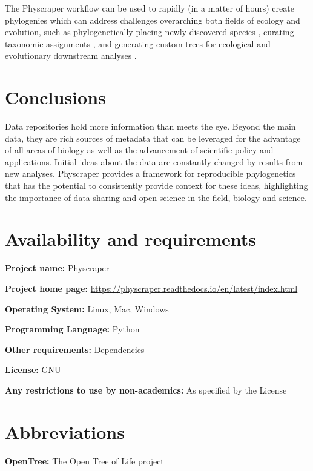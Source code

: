 \documentclass{bmcart}
\begin{document}
The Physcraper workflow can be used to rapidly (in a matter of hours) create
phylogenies which can address challenges overarching both fields of ecology and evolution, such as
phylogenetically placing newly discovered species \cite{webb2010biodiversity},
curating taxonomic assignments
\cite{san2010molecular},
and generating custom trees for ecological \cite{helmus2012phylogenetic} and
evolutionary downstream analyses \cite{stoltzfus2013phylotastic}.

\section*{Conclusions}
Data repositories hold more information than meets the eye.
Beyond the main data, they are rich sources of metadata that can be leveraged
for the advantage of all areas of biology as well as the advancement of scientific
policy and applications.
Initial ideas about the data are constantly changed by results from new analyses.
Physcraper provides a framework for reproducible phylogenetics that has the
potential to consistently provide context for these ideas, highlighting the
importance of data sharing and open science in the field, biology and science.

\section*{Availability and requirements}

\par{\textbf{Project name:} Physcraper}

\textbf{Project home page:} \href{https://physcraper.readthedocs.io/en/latest/index.html}{https://physcraper.readthedocs.io/en/latest/index.html}

\textbf{Operating System:} Linux, Mac, Windows

\textbf{Programming Language:} Python

\textbf{Other requirements:} Dependencies

\textbf{License:} GNU

\textbf{Any restrictions to use by non-academics:} As specified by the License

\section*{Abbreviations}

\par{\textbf{OpenTree:} The Open Tree of Life project}
\end{document}
